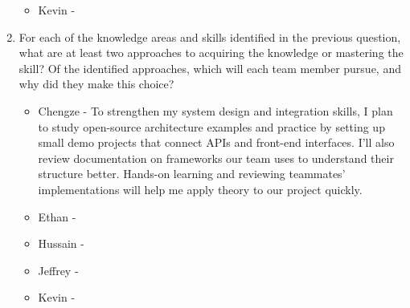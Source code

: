 \begin{enumerate}
\begin{itemize}
        \item Kevin - 
  \end{itemize} 
  \item For each of the knowledge areas and skills identified in the previous
  question, what are at least two approaches to acquiring the knowledge or
  mastering the skill?  Of the identified approaches, which will each team
  member pursue, and why did they make this choice?
  \begin{itemize}
        \item Chengze - To strengthen my system design and integration skills, 
        I plan to study open-source architecture examples and practice by setting 
        up small demo projects that connect APIs and front-end interfaces. I’ll also 
        review documentation on frameworks our team uses to understand their structure 
        better. Hands-on learning and reviewing teammates’ implementations will help 
        me apply theory to our project quickly.
        \item Ethan - 
        \item Hussain - 
        \item Jeffrey - 
        \item Kevin - 
  \end{itemize} 
\end{enumerate}

